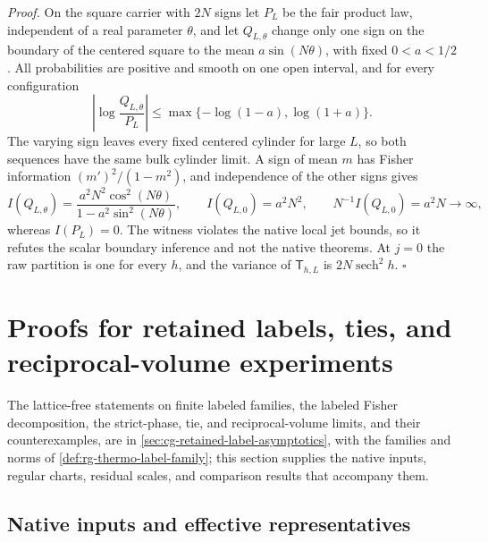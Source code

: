 \noindent\emph{Proof.}
On the square carrier with $2N$ signs let $P_L$ be the fair product law,
independent of a real parameter $\theta$, and let $Q_{L,\theta}$ change only
one sign on the boundary of the centered square to the mean
$a\sin(N\theta)$, with fixed $0<a<1/2$. All probabilities are positive and
smooth on one open interval, and for every configuration
\begin{equation}
 \left|\log\frac{Q_{L,\theta}}{P_L}\right|
 \le\max\{-\log(1-a),\log(1+a)\}.
 \label{eq:rg-thermo-native-boundary-ratio-control}
\end{equation}
The varying sign leaves every fixed centered cylinder for large $L$, so both
sequences have the same bulk cylinder limit. A sign of mean $m$ has Fisher
information $(m')^2/(1-m^2)$, and independence of the other signs gives
\begin{equation}
 I(Q_{L,\theta})=
   \frac{a^2N^2\cos^2(N\theta)}{1-a^2\sin^2(N\theta)},
 \qquad I(Q_{L,0})=a^2N^2,
 \qquad N^{-1}I(Q_{L,0})=a^2N\longrightarrow\infty,
 \label{eq:rg-thermo-native-boundary-score-growth}
\end{equation}
whereas $I(P_L)=0$. The witness violates the native local jet bounds, so it
refutes the scalar boundary inference and not the native theorems. At $j=0$
the raw partition is one for every $h$, and the variance of
$\mathsf T_{h,L}$ is $2N\operatorname{sech}^2h$. $\square$

\section{Proofs for retained labels, ties, and reciprocal-volume experiments}
\label{sec:rg-thermo-label-proof}

The lattice-free statements on finite labeled families, the labeled Fisher
decomposition, the strict-phase, tie, and reciprocal-volume limits, and their
counterexamples, are in \cref{sec:cg-retained-label-asymptotics}, with the
families and norms of \cref{def:rg-thermo-label-family}; this section supplies
the native inputs, regular charts, residual scales, and comparison results
that accompany them.

\subsection{Native inputs and effective representatives}
\label{sec:rg-thermo-label-inputs}

